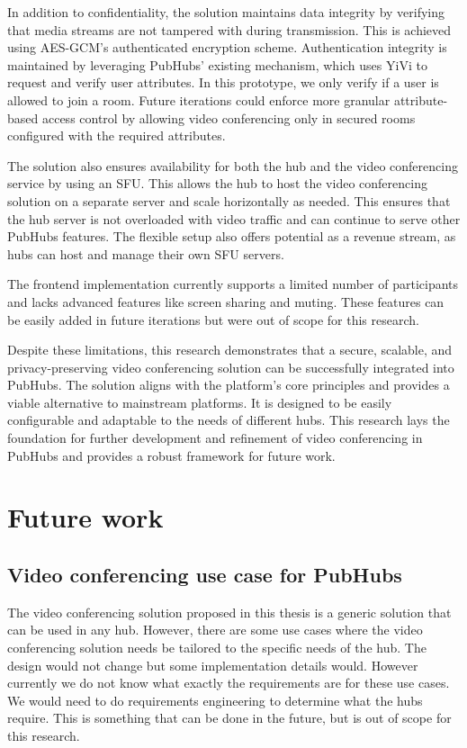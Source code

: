 \documentclass{report}
\begin{document}
In addition to confidentiality, the solution maintains data integrity by verifying that media streams are not
tampered with during transmission. This is achieved using AES-GCM’s authenticated encryption scheme. Authentication
integrity is maintained by leveraging PubHubs’ existing mechanism, which uses YiVi to request and verify user
attributes. In this prototype, we only verify if a user is allowed to join a room. Future iterations could enforce
more granular attribute-based access control by allowing video conferencing only in secured rooms configured with
the required attributes.

The solution also ensures availability for both the hub and the video conferencing service by using an SFU. This
allows the hub to host the video conferencing solution on a separate server and scale horizontally as needed. This
ensures that the hub server is not overloaded with video traffic and can continue to serve other PubHubs features.
The flexible setup also offers potential as a revenue stream, as hubs can host and manage their own SFU servers.

The frontend implementation currently supports a limited number of participants and lacks advanced features like
screen sharing and muting. These features can be easily added in future iterations but were out of scope for this
research.

Despite these limitations, this research demonstrates that a secure, scalable, and privacy-preserving video
conferencing solution can be successfully integrated into PubHubs. The solution aligns with the platform’s core
principles and provides a viable alternative to mainstream platforms. It is designed to be easily configurable and
adaptable to the needs of different hubs. This research lays the foundation for further development and refinement
of video conferencing in PubHubs and provides a robust framework for future work.

\chapter{Future work}
\section{Video conferencing use case for PubHubs}
The video conferencing solution proposed in this thesis is a generic solution that can be used in any hub. However,
there are some use cases where the video conferencing solution needs be tailored to the specific needs of the hub.
The design would not change but some implementation details would. However currently we do not know what exactly the
requirements are for these use cases. We would need to do requirements engineering to determine what the hubs require.
This is something that can be done in the future, but is out of scope for this research.
\end{document}
